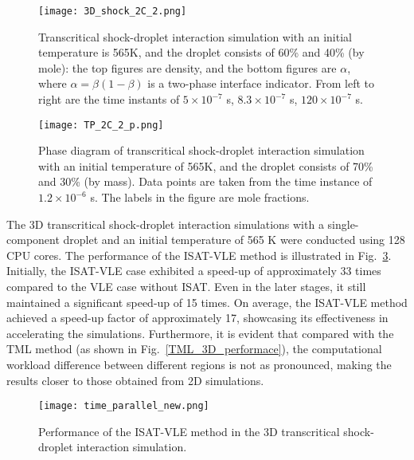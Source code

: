 \begin{figure}[htbp]
\centering
\texttt{[image: 3D\_shock\_2C\_2.png]}
\caption{Transcritical shock-droplet interaction simulation with an initial temperature is 565K, and the droplet consists of 60\% and 40\% (by mole): the top figures are density, and the bottom figures are $\alpha$, where $\alpha = \beta (1-\beta)$ is a two-phase interface indicator. From left to right are the time instants of $5\times 10^{-7}$ s, $8.3\times 10^{-7}$ s, $120\times 10^{-7}$ s.}
\label{droplet_3d_2C} 
\end{figure}

\begin{figure}[htbp]
\centering
\texttt{[image: TP\_2C\_2\_p.png]}
\caption{Phase diagram of transcritical shock-droplet interaction simulation with an initial temperature of 565K, and the droplet consists of 70\% and 30\% (by mass). Data points are taken from the time instance of $1.2\times 10^{-6}$ s. The labels in the figure are mole fractions.}
\label{droplet_3D_2C_phasediagram} 
\end{figure}

The 3D transcritical shock-droplet interaction simulations with a single-component droplet and an initial temperature of 565 K were conducted using 128 CPU cores. The performance of the ISAT-VLE method is illustrated in Fig.~\ref{droplet_3D_perf}. Initially, the ISAT-VLE case exhibited a speed-up of approximately 33 times compared to the VLE case without ISAT. Even in the later stages, it still maintained a significant speed-up of 15 times. On average, the ISAT-VLE method achieved a speed-up factor of approximately 17, showcasing its effectiveness in accelerating the simulations. Furthermore, it is evident that compared with the TML method (as shown in Fig.~\ref{TML_3D_performace}), the computational workload difference between different regions is not as pronounced, making the results closer to those obtained from 2D simulations.


 

\begin{figure}[htbp]
\centering
\texttt{[image: time\_parallel\_new.png]}
\caption{Performance of the ISAT-VLE method in the 3D transcritical shock-droplet interaction simulation.}
\label{droplet_3D_perf} 
\end{figure}



